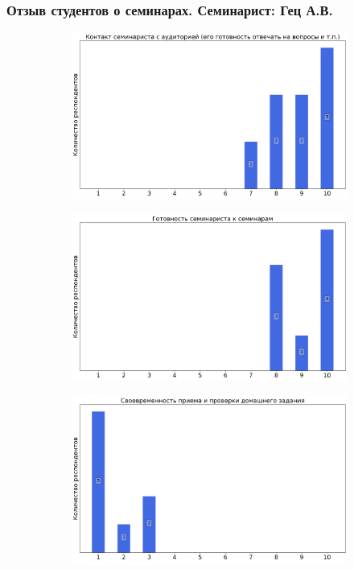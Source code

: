     \subsubsection{Отзыв студентов о семинарах. Семинарист: Гец А.В.}
		\begin{figure}[H]
			\centering
			\begin{subfigure}[b]{0.45\textwidth}
				\centering
				\includegraphics[width=\textwidth]{images/3 course/Теория поля/seminarists-marks-Гец А.В.-0.png}
			\end{subfigure}
			\begin{subfigure}[b]{0.45\textwidth}
				\centering
				\includegraphics[width=\textwidth]{images/3 course/Теория поля/seminarists-marks-Гец А.В.-1.png}
			\end{subfigure}
			\begin{subfigure}[b]{0.45\textwidth}
				\centering
				\includegraphics[width=\textwidth]{images/3 course/Теория поля/seminarists-marks-Гец А.В.-2.png}

\end{subfigure}
\end{figure}
